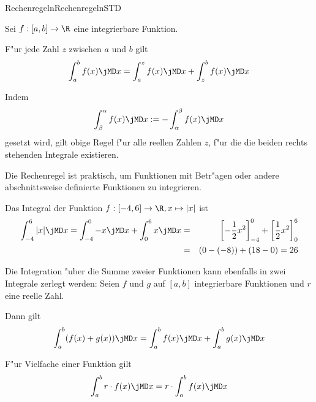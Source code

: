 \begin{MXContent}{Rechenregeln}{Rechenregeln}{STD}

Sei $f: [a, b] \rightarrow \R$ eine integrierbare Funktion.

F"ur jede Zahl $z$ zwischen $a$ und $b$ gilt
\begin{equation}
\int_a^b f(x) \jMD x = \int_a^z f(x) \jMD x + \int_z^b f(x) \jMD x %
\end{equation}

Indem 
\begin{equation}
\int_\beta^\alpha f(x) \jMD x := -\int_\alpha^\beta f(x) \jMD x %
\end{equation}
gesetzt wird, gilt obige Regel f"ur alle reellen Zahlen $z$, f"ur die die 
beiden rechts stehenden Integrale existieren.

Die Rechenregel ist praktisch, um Funktionen mit Betr"agen oder andere 
abschnittsweise definierte Funktionen zu integrieren.

\begin{MExample}
Das Integral der Funktion $f: [-4, 6] \rightarrow \R, x \mapsto |x|$ ist
\begin{eqnarray*}
\int_{-4}^{6} |x| \jMD x %
 = \int_{-4}^{0} -x \jMD x + \int_{0}^{6} x \jMD x %
 & = & \left[-\frac{1}{2} x^2\right]_{-4}^{0} %
   + \left[\frac{1}{2} x^2\right]_{0}^{6} \\
 & = & (0 - (-8)) + (18 - 0) %
 = 26 %
\end{eqnarray*}
\end{MExample}

Die Integration "uber die Summe zweier Funktionen kann ebenfalls in zwei 
Integrale zerlegt werden: 
Seien $f$ und $g$ auf $[a, b]$ integrierbare Funktionen und $r$ eine reelle Zahl.

Dann gilt
\begin{equation}
\int_a^b (f(x) + g(x)) \jMD x = \int_a^b f(x) \jMD x + \int_a^b g(x) \jMD x %
\end{equation}

F"ur Vielfache einer Funktion gilt
\begin{equation}
\int_a^b r \cdot f(x) \jMD x = r \cdot \int_a^b f(x) \jMD x %
\end{equation}
\end{MXContent}



